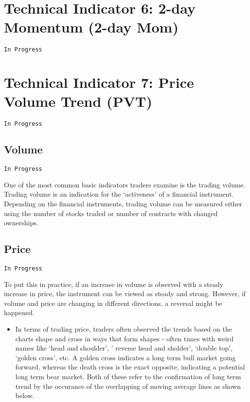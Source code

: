 \documentclass[
]{book}
\providecommand{\tightlist}{%
  \setlength{\itemsep}{0pt}\setlength{\parskip}{0pt}}
\begin{document}
\hypertarget{technical-indicator-6-2-day-momentum-2-day-mom}{%
\section{Technical Indicator 6: 2-day Momentum (2-day
Mom)}\label{technical-indicator-6-2-day-momentum-2-day-mom}}

\texttt{In\ Progress}

\hypertarget{technical-indicator-7-price-volume-trend-pvt}{%
\section{Technical Indicator 7: Price Volume Trend
(PVT)}\label{technical-indicator-7-price-volume-trend-pvt}}

\texttt{In\ Progress}

\hypertarget{volume}{%
\subsection{Volume}\label{volume}}

\texttt{In\ Progress}

One of the most common basic indicators traders examine is the trading
volume. Trading volume is an indication for the `activeness' of a
financial instrument. Depending on the financial instruments, trading
volume can be measured either using the number of stocks traded or
number of contracts with changed ownerships.

\hypertarget{price}{%
\subsection{Price}\label{price}}

\texttt{In\ Progress}

To put this in practice, if an increase in volume is observed with a
steady increase in price, the instrument can be viewed as steady and
strong. However, if volume and price are changing in different
directions, a reversal might be happened.

\begin{itemize}
\tightlist
\item
  In terms of trading price, traders often observed the trends based on
  the charts shape and cross in ways that form shapes - often times with
  weird names like `head and shoulder', ' reverse head and sholder',
  `double top', `golden cross', etc. A golden cross indicates a long
  term bull market going forward, whereas the death cross is the exact
  opposite, indicating a potential long term bear market. Both of these
  refer to the confirmation of long term trend by the occurance of the
  overlapping of moving average lines as shown below.
\end{itemize}
\end{document}
